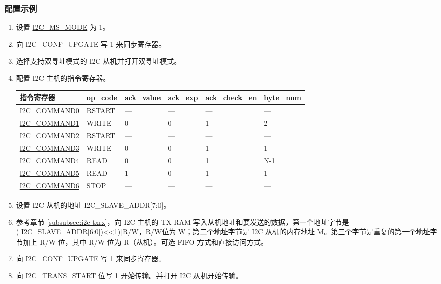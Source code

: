 \documentclass[main\_\_CN.tex]{subfiles}
\begin{document}
\subsubsection{配置示例}
\begin{enumerate}
\item 设置 \hyperref[fielddesc:I2CMSMODE]{I2C\_MS\_MODE} 为 1。
\item 向 \hyperref[fielddesc:I2CCONFUPGATE]{I2C\_CONF\_UPGATE} 写 1 来同步寄存器。

\item 选择支持双寻址模式的 I2C 从机并打开双寻址模式。

\item 配置 I2C 主机的指令寄存器。
\begin{longtable}{ | p{4cm} | p{2cm} | p{2cm} | p{2cm} |p{2cm} | p{2cm} |}
\hline\rowcolor{lightgray}
指令寄存器& op\_code & ack\_value&ack\_exp&ack\_check\_en&byte\_num  \\ \hline
\hyperref[fielddesc:I2CCOMMAND0]{I2C\_COMMAND0} & RSTART& ---&---&---&---  \\ \hline
\hyperref[fielddesc:I2CCOMMAND1]{I2C\_COMMAND1} & WRITE& 0&0&1&2  \\ \hline
\hyperref[fielddesc:I2CCOMMAND2]{I2C\_COMMAND2} & RSTART& ---&---&---&---  \\ \hline
\hyperref[fielddesc:I2CCOMMAND3]{I2C\_COMMAND3} & WRITE& 0&0&1&1  \\ \hline
\hyperref[fielddesc:I2CCOMMAND4]{I2C\_COMMAND4} & READ& 0&0&1&N-1  \\ \hline
\hyperref[fielddesc:I2CCOMMAND5]{I2C\_COMMAND5} & READ& 1&0&1&1  \\ \hline
\hyperref[fielddesc:I2CCOMMAND6]{I2C\_COMMAND6} & STOP& ---&---&---&---  \\ \hline
\end{longtable}

\item 设置 I2C 从机的地址 I2C\_SLAVE\_ADDR[7:0]。
\item 参考章节 \ref{subsubsec:i2c-txrx}，向 I2C 主机的 TX RAM 写入从机地址和要发送的数据，第一个地址字节是 \\( I2C\_SLAVE\_ADDR[6:0])<<1)|R/W，R/W位为 W；第二个地址字节是 I2C 从机的内存地址 M。第三个字节是重复的第一个地址字节加上 R/W 位，其中 R/W 位为 R（从机）。可选 FIFO 方式和直接访问方式。

\item 向 \hyperref[fielddesc:I2CCONFUPGATE]{I2C\_CONF\_UPGATE} 写 1 来同步寄存器。
\item 向 \hyperref[fielddesc:I2CTRANSSTART]{I2C\_TRANS\_START} 位写 1 开始传输。并打开 I2C 从机开始传输。



\end{enumerate}
\end{document}
